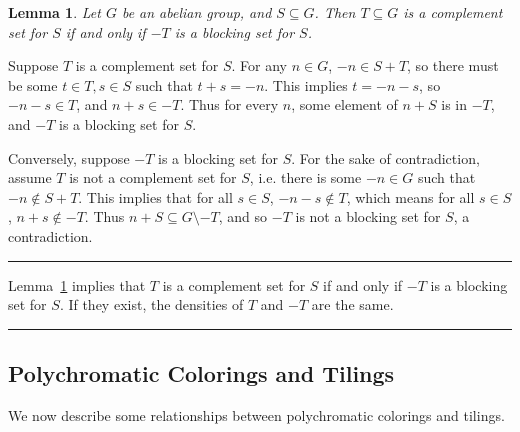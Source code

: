 \documentclass[12pt]{article}
\newenvironment{proof}{{\bf Proof:  }}{\hfill\rule{2mm}{2mm}}
\newenvironment{proofof}[1]{{\bf Proof of #1:  }}{\hfill\rule{2mm}{2mm}}
\newtheorem{lemma}[theorem]{Lemma}
\begin{document}
\begin{lemma}\label{CompTur}
Let $G$ be an abelian group, and $S \subseteq G$.  Then $T\subseteq G$ is a complement set for $S$ if and only if $-T$ is a blocking set for $S$.
\end{lemma}


\begin{proof}
Suppose $T$ is a complement set for $S$. For any $n \in G$, $-n \in S+T$, so there must be some $t\in T, s\in S$ such that $t+s = -n$. This implies $t=-n-s$, so $-n-s \in T$, and $n+s \in -T$. Thus  for every $n$, some element of $n+S$ is in $-T$, and $-T$ is a blocking set for $S$.

Conversely, suppose $-T$ is a blocking set for $S$. For the sake of contradiction, assume $T$ is not a complement set for $S$, i.e. there is some $-n\in G$ such that $-n \notin S+T$. This implies that for all $s \in S$, $-n-s \notin T$, which means for all $s\in S$, $n+s \notin -T$. Thus $n+S \subseteq G\setminus -T$, and so $-T$ is not a blocking set for $S$, a contradiction.
\end{proof}


\begin{proofof}{Lemma~\ref{alphc}}
Lemma~\ref{CompTur} implies that $T$ is a complement set for $S$ if and only if $-T $ is a blocking set for $S$. If they exist, the densities of $T$ and $-T$ are the same.
\end{proofof}



\subsection{Polychromatic Colorings and Tilings}\label{tiliff}

We now describe some relationships between polychromatic colorings and tilings.
\end{document}
